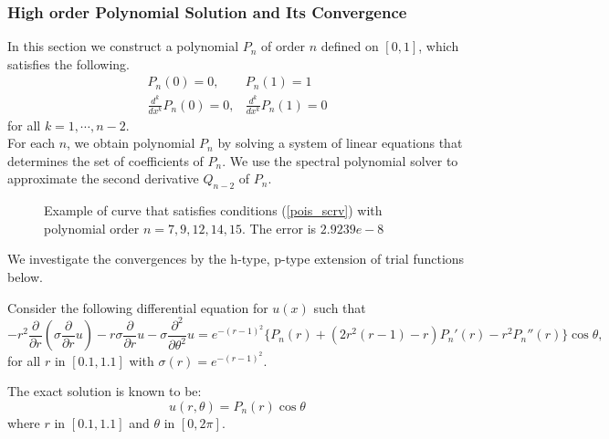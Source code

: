
\subsubsection {High order Polynomial Solution and Its Convergence}

In this section we construct a polynomial $P_n$ of order $n$ defined on $[0,1]$, which satisfies the following.
\begin{eqnarray}
\label{pois_scrv}
    P_n(0) = 0, &P_n(1) = 1 \\
    \frac{d^k}{dx^k}P_n(0) = 0, &\frac{d^k}{dx^k}P_n(1) = 0
\end{eqnarray}
for all $k = 1, \cdots, n-2$. \\
For each $n$, we obtain polynomial $P_n$ by solving a system of
linear equations that determines the set of coefficients of $P_n$.
We use the spectral polynomial solver to approximate the second
derivative $Q_{n-2}$ of $P_n$.

\begin{figure}[h]
    \begin{center}
    \caption{\label{scrvsol}Example of curve that satisfies conditions (\ref{pois_scrv}) with polynomial order $n=7, 9, 12, 14, 15$. The error is $2.9239e-8$}
    \end{center}
\end{figure}

We investigate the convergences by the h-type, p-type extension of
trial functions below.

\begin{problem}
Consider the following differential equation for $u(x)$ such that
\begin{equation}
\label{poi_poly}
-r^2 \frac{\partial}{\partial r} (\sigma \frac{\partial}{\partial r}u) - r \sigma \frac{\partial}{\partial r}u - \sigma \frac{\partial^2}{\partial \theta^2}u = e^{-(r-1)^2}\{P_n(r) + (2r^2(r-1)-r)P_n'(r) - r^2 P_n''(r)\} \cos \theta,
\end{equation}
for all $r$ in $[0.1, 1.1]$ with $\sigma(r) = e^{-(r-1)^2}$.

The exact solution is known to be:
\begin{equation}
u(r, \theta) = P_n(r) \cos \theta
\end{equation}
where $r$ in $[0.1, 1.1]$ and $\theta$ in $[0, 2\pi]$.
\end{problem}

